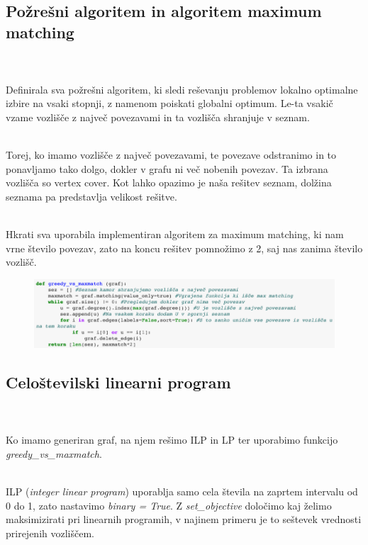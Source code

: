 \documentclass[12pt,a4paper]{amsart}
\theoremstyle{definition} %
\theoremstyle{plain} %
\begin{document}
\newpage

\subsection{Požrešni algoritem in algoritem maximum matching}
\
\\
\\
Definirala sva požrešni algoritem, ki sledi reševanju problemov lokalno optimalne izbire na vsaki stopnji, z namenom poiskati globalni optimum. Le-ta vsakič vzame vozlišče z največ povezavami in ta vozlišča shranjuje v seznam. 

 \hspace*{\fill} %
\\
Torej, ko imamo vozlišče z največ povezavami, te povezave odstranimo in to ponavljamo tako dolgo, dokler v grafu ni več nobenih povezav. Ta izbrana vozlišča so vertex cover. Kot lahko opazimo je naša rešitev seznam, dolžina seznama pa predstavlja velikost rešitve. 

 \hspace*{\fill} %
\\
Hkrati sva uporabila implementiran algoritem za maximum matching, ki nam vrne število povezav, zato na koncu rešitev pomnožimo z 2, saj nas zanima število vozlišč. 

\begin{figure}[ht]
\centering
\includegraphics[width=1\textwidth]{Screen1.png}
\end{figure}




\subsection{Celoštevilski linearni program}
\
\\
\\
Ko imamo generiran graf, na njem rešimo ILP in LP ter uporabimo funkcijo \textit{greedy\_vs\_maxmatch}.

 \hspace*{\fill} %
\\
ILP (\textit{integer linear program}) uporablja samo cela števila na zaprtem intervalu od 0 do 1, zato nastavimo \textit{binary = True}. Z \textit{set\_objective} določimo kaj želimo maksimizirati pri linearnih programih, v najinem primeru je to seštevek vrednosti prirejenih vozliščem. 
\end{document}
